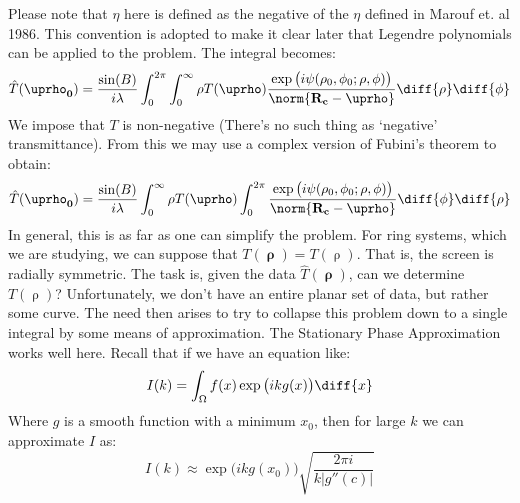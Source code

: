 \documentclass[crop=false,class=book,oneside]{standalone}
\begin{document}
            Please note that $\eta$ here is defined as the negative
            of the $\eta$ defined in Marouf et. al 1986. This
            convention is adopted to make it clear later that
            Legendre polynomials can be applied to the problem.
            The integral becomes:
            \begin{equation}
                \hat{T}(\boldsymbol{\uprho_{0}})
                =\frac{\sin(B)}{i\lambda}
                    \int_{0}^{2\pi}\int_{0}^{\infty}\rho
                    T(\boldsymbol{\uprho})
                    \frac{\exp\big(i\psi(\rho_{0},\phi_{0};
                          \rho,\phi)\big)}
                         {\norm{\mathbf{R_{c}}-\boldsymbol{\uprho}}}
                    \diff{\rho}\diff{\phi}
            \end{equation}
            We impose that $T$ is non-negative
            (There's no such thing as `negative' transmittance).
            From this we may use a complex version of Fubini's
            theorem to obtain:
            \begin{equation}
                \hat{T}(\boldsymbol{\uprho_{0}})
                =\frac{\sin(B)}{i\lambda}
                    \int_{0}^{\infty}\rho{T}(\boldsymbol{\uprho})
                    \int_{0}^{2\pi}
                    \frac{\exp\big(i\psi(\rho_{0},\phi_{0};
                          \rho,\phi)\big)}
                         {\norm{\mathbf{R_{c}}-\boldsymbol{\uprho}}}
                    \diff{\phi}\diff{\rho}
            \end{equation}
                In general, this is as far as one can simplify the
                problem. For ring systems, which we are studying, we
                can suppose that $T(\boldsymbol{\uprho})=T(\uprho)$.
                That is, the screen is radially symmetric. The task
                is, given the data $\hat{T}(\boldsymbol{\uprho})$,
                can we determine $T(\uprho)$? Unfortunately, we don't
                have an entire planar set of data, but rather some
                curve. The need then arises to try to collapse this
                problem down to a single integral by some means of
                approximation. The Stationary Phase Approximation
                works well here. Recall that if we have an equation
                like:
                \begin{equation}
                    I(k)=
                    \int_{\Omega}f(x)\exp\big(ikg(x)\big)\diff{x}
                \end{equation}
                Where $g$ is a smooth function with a minimum
                $x_{0}$, then for large $k$
                we can approximate $I$ as:
                \begin{equation}
                    I(k)\approx
                    \exp\big(ikg(x_{0})\big)
                        \sqrt{\frac{2\pi{i}}{k|g''(c)|}}
                \end{equation}
\end{document}
